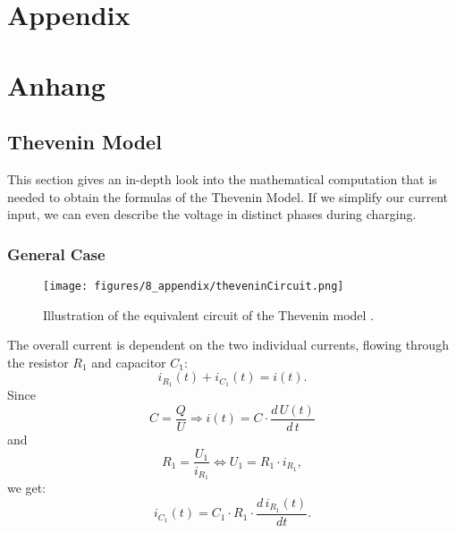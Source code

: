 
{\chapter{Appendix}}    %
{\chapter{Anhang}}      %
\label{chap:appendix}

\section{Thevenin Model}
\label{sec:TheveninFormula}
This section gives an in-depth look into the mathematical computation that is needed to obtain the formulas of the Thevenin Model. If we simplify our current input, we can even describe the voltage in distinct phases during charging.
\subsection{General Case}
\begin{figure}[H]
    \centering
    \texttt{[image: figures/8\_appendix/theveninCircuit.png]}
    \caption{Illustration of the equivalent circuit of the Thevenin model \cite{plett2018batterybootcamp}.}
    \label{fig:circuitThev}
\end{figure}
The overall current is dependent on the two individual currents, flowing through the resistor $R_1$ and capacitor $C_1$: 
\begin{equation} \label{eq:thev1}
i_{R_1}(t) + i_{C_1}(t) = i(t).
\end{equation}
Since 
\begin{equation} \label{eq:thev2}
C = \frac{Q}{U} \Rightarrow i(t) = C \cdot \frac{d \, U(t)}{d \, t} 
\end{equation}
and 
\begin{equation} \label{eq:thev3}
R_1 = \frac{U_1}{i_{R_1}} \Leftrightarrow U_1 = R_1 \cdot i_{R_1},
\end{equation}
we get: 
\begin{equation} \label{eq:thev4}
i_{C_1}(t) = C_1 \cdot R_1 \cdot \frac{d \, i_{R_1}(t)}{d t}.
\end{equation}

